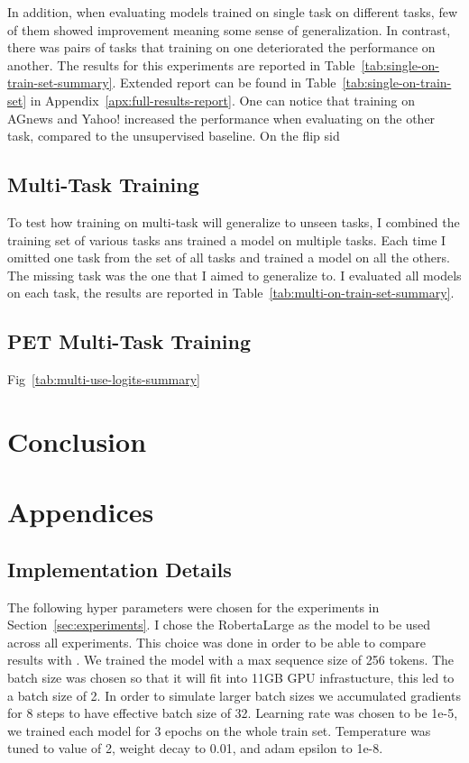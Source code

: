 \documentclass[11pt,a4paper]{article}
\begin{document}
In addition, when evaluating models trained on single task on different tasks, few of them showed improvement meaning some sense of generalization.
In contrast, there was pairs of tasks that training on one deteriorated the performance on another.
The results for this experiments are reported in Table~\ref{tab:single-on-train-set-summary}.
Extended report can be found in Table~\ref{tab:single-on-train-set} in Appendix~\ref{apx:full-results-report}.
One can notice that training on AGnews and Yahoo! increased the performance when evaluating on the other task, compared to the unsupervised baseline.
On the flip sid

\subsection{Multi-Task Training}



To test how training on multi-task will generalize to unseen tasks, I combined the training set of various tasks ans trained a model on multiple tasks.
Each time I omitted one task from the set of all tasks and trained a model on all the others.
The missing task was the one that I aimed to generalize to.
I evaluated all models on each task, the results are reported in Table~\ref{tab:multi-on-train-set-summary}.


\subsection{PET Multi-Task Training}
Fig~\ref{tab:multi-use-logits-summary}




\section{Conclusion}





\newpage
\appendix

\section{Appendices}
\label{sec:appendix}

\subsection{Implementation Details}
The following hyper parameters were chosen for the experiments in Section~\ref{sec:experiments}.
I chose the RobertaLarge as the model to be used across all experiments.
This choice was done in order to be able to compare results with \citet{schick2020exploiting}.
We trained the model with a max sequence size of 256 tokens.
The batch size was chosen so that it will fit into 11GB GPU infrastucture, this led to a batch size of 2. 
In order to simulate larger batch sizes we accumulated gradients for 8 steps to have effective batch size of 32.
Learning rate was chosen to be 1e-5, we trained each model for 3 epochs on the whole train set.
Temperature was tuned to value of 2, weight decay to 0.01, and adam epsilon to 1e-8.
\end{document}
